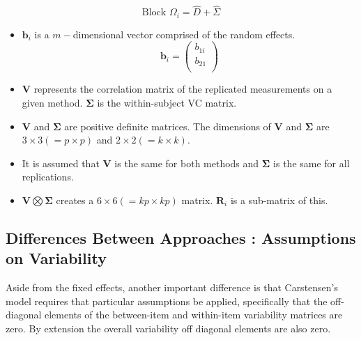 \documentclass[12pt, a4paper]{article}
\theoremstyle{plain}
\theoremstyle{definition}
\theoremstyle{remark}
\begin{document}
		\begin{equation}
		\mbox{Block  }\Omega_{i} = \hat{D} + \hat{\Sigma}
		\end{equation}
	\begin{itemize}
		
		
		\item $\boldsymbol{b}_{i}$ is a $m-$dimensional vector comprised of
		the random effects.
		\begin{equation}
		\boldsymbol{b}_{i} = \left( \begin{array}{c}
		b_{1i} \\
		b_{21}  \\
		\end{array}\right)
		\end{equation}
		
		\item $\boldsymbol{V}$ represents the correlation matrix of the replicated measurements on a given method.
		$\boldsymbol{\Sigma}$ is the within-subject VC matrix.
		
		\item $\boldsymbol{V}$ and $\boldsymbol{\Sigma}$ are positive
		definite matrices. The dimensions of $\boldsymbol{V}$ and
		$\boldsymbol{\Sigma}$ are $3 \times 3 ( = p \times p )$ and $ 2 \times
		2 (= k \times k)$.
		
		\item It is assumed that $\boldsymbol{V}$ is the same for both methods and $\boldsymbol{\Sigma}$ is
		the same for all replications.
		
		\item $\boldsymbol{V} \bigotimes \boldsymbol{\Sigma}$ creates a $ 6 \times 6 ( = kp \times
		kp)$ matrix.
		$\boldsymbol{R}_{i}$ is a sub-matrix of this.
	\end{itemize}
	
	\subsection{Differences Between Approaches : Assumptions on Variability}
	Aside from the fixed effects, another important difference is that Carstensen's model requires that particular assumptions be applied, specifically that the off-diagonal elements of the between-item
	and within-item variability matrices are zero. By extension the
	overall variability off diagonal elements are also zero.
	
\end{document}
